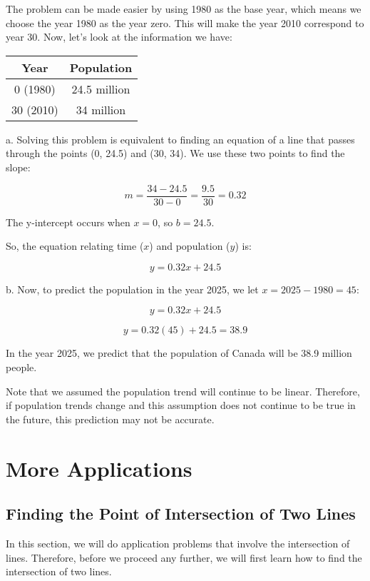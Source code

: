 \begin{solution}
The problem can be made easier by using 1980 as the base year, which means we choose the year 1980 as the year zero. This will make the year 2010 correspond to year 30. Now, let's look at the information we have:

\begin{center}
\begin{tabular}{|c|c|}
\hline
Year & Population \\
\hline
0 (1980) & 24.5 million \\
30 (2010) & 34 million \\
\hline
\end{tabular}
\end{center}
a. Solving this problem is equivalent to finding an equation of a line that passes through the points (0, 24.5) and (30, 34). We use these two points to find the slope:

\[ m = \frac{34 - 24.5}{30 - 0} = \frac{9.5}{30} = 0.32 \]

The y-intercept occurs when \( x = 0 \), so \( b = 24.5 \).

So, the equation relating time (\( x \)) and population (\( y \)) is:

\[ y = 0.32x + 24.5 \]

b. Now, to predict the population in the year 2025, we let \( x = 2025 - 1980 = 45 \):

\[ y = 0.32x + 24.5 \]

\[ y = 0.32(45) + 24.5 = 38.9 \]

In the year 2025, we predict that the population of Canada will be 38.9 million people.

Note that we assumed the population trend will continue to be linear. Therefore, if population trends change and this assumption does not continue to be true in the future, this prediction may not be accurate.
\end{solution}


\section{More Applications}
\subsection{Finding the Point of Intersection of Two Lines}

In this section, we will do application problems that involve the intersection of lines. Therefore, before we proceed any further, we will first learn how to find the intersection of two lines.

